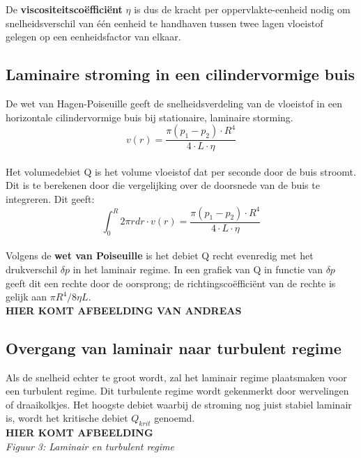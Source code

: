 De \textbf{viscositeitsco\"effici\"ent} $\eta$ is dus de kracht per oppervlakte-eenheid nodig 
om snelheidsverschil van \'e\'en eenheid te handhaven tussen twee lagen vloeistof gelegen 
op een eenheidsfactor van elkaar.

\subsection{Laminaire stroming in een cilindervormige buis}

De wet van Hagen-Poiseuille geeft de snelheidsverdeling van de vloeistof 
in een horizontale cilindervormige buis bij stationaire, laminaire storming.
\\

$$v(r) = \frac{\pi(p_{1}-p_{2}) \cdot R^4}{4 \cdot L \cdot \eta}$$
\\
Het volumedebiet Q is het volume vloeistof dat per seconde door de buis stroomt.
Dit is te berekenen door die vergelijking over de doorsnede van de buis te integreren. 
Dit geeft: 
\\

$$\int_0^R2 \pi rdr \cdot v(r) = \frac{\pi(p_{1} - p_{2})\cdot R^4}{4 \cdot L \cdot \eta} $$
\\

Volgens de \textbf{wet van Poiseuille} is het debiet Q recht evenredig met het 
drukverschil $\delta p$ in het laminair regime. In een grafiek van Q in functie
van $\delta p$ geeft dit een rechte door de oorsprong; de richtingsco\"effici\"ent van de rechte is gelijk aan $\pi R^4 / 8\eta L$.
\\

\textbf{HIER KOMT AFBEELDING VAN ANDREAS}
\\

\subsection{Overgang van laminair naar turbulent regime}

Als de snelheid echter te groot wordt, zal het laminair regime plaatsmaken voor een turbulent regime. 
Dit turbulente regime wordt gekenmerkt door wervelingen of draaikolkjes. Het hoogste
debiet waarbij de stroming nog juist stabiel laminair is, wordt het kritische debiet
$Q_{krit}$ genoemd.
\\

\textbf{HIER KOMT AFBEELDING}
\\

\textit{Figuur 3: Laminair en turbulent regime}
\\

